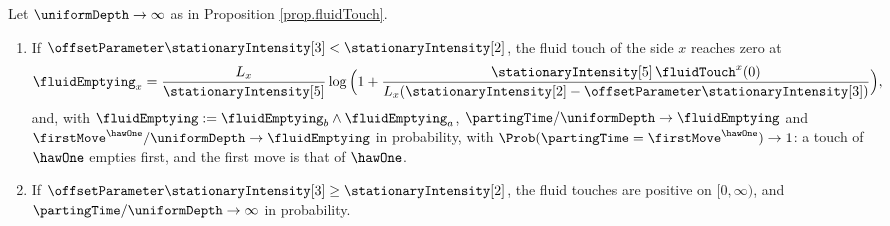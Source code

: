 \begin{corol}\label{corol.twoRegimes}
 Let $\uniformDepth \to \infty$ as in Proposition \ref{prop.fluidTouch}.
 \begin{enumerate}[label={\emph{\roman{*}}.}]
  \item If $\offsetParameter\stationaryIntensity[3] < \stationaryIntensity[2]$,
        the fluid touch of the side $x$ reaches zero at
        \begin{equation}\label{eq.fluidEmptying}
         \fluidEmptying_{x}
         = \frac{L_x}{\stationaryIntensity[5]}
         \log \Big( 1 + \frac{\stationaryIntensity[5] \, \fluidTouch^{x}(0)}
         {L_x (\stationaryIntensity[2] - \offsetParameter\stationaryIntensity[3])} \Big) ,
        \end{equation}
        and, with $\fluidEmptying := \fluidEmptying_{b} \wedge \fluidEmptying_{a}$,
        $\partingTime/\uniformDepth \to \fluidEmptying$
        and $\firstMove^{\hawOne}/\uniformDepth \to \fluidEmptying$ in probability,
        with $\Prob(\partingTime = \firstMove^{\hawOne}) \to 1$:
        a touch of $\hawOne$ empties first,
        and the first move is that of $\hawOne$.
  \item If $\offsetParameter\stationaryIntensity[3] \geq \stationaryIntensity[2]$,
        the fluid touches are positive on $[0, \infty)$,
        and $\partingTime/\uniformDepth \to \infty$ in probability.
 \end{enumerate}
\end{corol}
